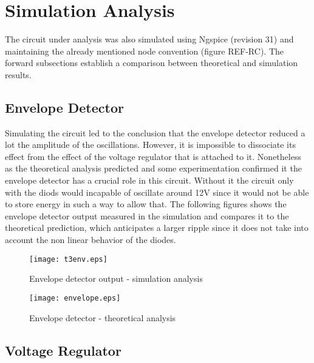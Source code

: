 \section{Simulation Analysis}
\label{sec:simulation}

The circuit under analysis was also simulated using Ngspice (revision 31) and maintaining the already mentioned node convention (figure REF-RC). The forward subsections establish a comparison between theoretical and simulation results.

\subsection{Envelope Detector}

Simulating the circuit led to the conclusion that the envelope detector reduced a lot the amplitude of the oscillations. However, it is impossible to dissociate its effect from the effect of the voltage regulator that is attached to it. Nonetheless as the theoretical analysis predicted and some experimentation confirmed it the envelope detector has a crucial role in this circuit. Without it the circuit only with the diods would incapable of oscillate around 12V since it would not be able to store energy in such a way to allow that. The following figures shows the envelope detector output measured in the simulation and compares it to the theoretical prediction, which anticipates a larger ripple since it does not take into account the non linear behavior of the diodes. 



\begin{figure}[h] \centering
  \begin{minipage}{.45\textwidth}
    \texttt{[image: t3env.eps]}
    \caption{Envelope detector output - simulation analysis}
    \label{fig:simenv}
  \end{minipage}%
    \hspace{2 mm}
  \begin{minipage}{.45\textwidth}
  \centering
    \texttt{[image: envelope.eps]}
    \caption{Envelope detector - theoretical analysis}
    \label{fig:compenv}
      \end{minipage}%
\end{figure}

\newpage
\subsection{Voltage Regulator}

